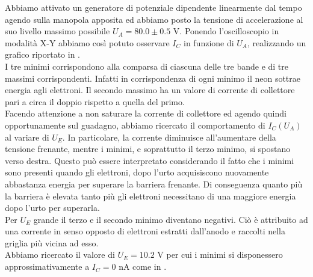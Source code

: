 Abbiamo attivato un generatore di potenziale dipendente linearmente dal tempo agendo sulla manopola apposita ed abbiamo posto la tensione di accelerazione al suo livello massimo possibile $U_A = 80.0 \pm 0.5$ V. Ponendo l'oscilloscopio in modalità X-Y abbiamo così potuto osservare $I_C$ in funzione di $U_A$, realizzando un grafico riportato in . \\
I tre minimi corrispondono alla comparsa di ciascuna delle tre bande e di tre massimi corrispondenti. Infatti in corrispondenza di ogni minimo il neon sottrae energia agli elettroni. Il secondo massimo ha un valore di corrente di collettore pari a circa il doppio rispetto a quella del primo.\\
Facendo attenzione a non saturare la corrente di collettore ed agendo quindi opportunamente sul guadagno, abbiamo ricercato il comportamento di $I_C(U_A)$ al variare di $U_E$. In particolare, la corrente diminuisce all'aumentare della tensione frenante, mentre i minimi, e soprattutto il terzo minimo, si spostano verso destra. Questo può essere interpretato considerando il fatto che i minimi sono presenti quando gli elettroni, dopo l'urto acquisiscono nuovamente abbastanza energia per superare la barriera frenante. Di conseguenza quanto più la barriera è elevata tanto più gli elettroni necessitano di una maggiore energia dopo l'urto per superarla.\\ 
Per $U_E$ grande il terzo e il secondo minimo diventano negativi. Ciò è attribuito ad una corrente in senso opposto di elettroni estratti dall'anodo e raccolti nella griglia più vicina ad esso.\\
Abbiamo ricercato il valore di $U_E = 10.2$ V per cui i minimi si disponessero approssimativamente a $I_C = 0$ nA come in .
